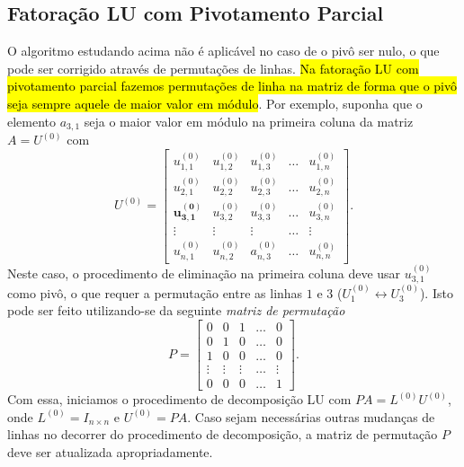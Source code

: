 \subsection{Fatoração LU com Pivotamento Parcial}

O algoritmo estudando acima não é aplicável no caso de o pivô ser nulo, o que pode ser corrigido através de permutações de linhas. \hl{Na fatoração LU com pivotamento parcial fazemos permutações de linha na matriz de forma que o pivô seja sempre aquele de maior valor em módulo}. Por exemplo, suponha que o elemento $a_{3,1}$ seja o maior valor em módulo na primeira coluna da matriz $A = U^{(0)}$ com
\begin{equation}
  U^{(0)} = \begin{bmatrix}
    u_{1,1}^{(0)} & u_{1,2}^{(0)} & u_{1,3}^{(0)} & \ldots & u_{1,n}^{(0)} \\
    u_{2,1}^{(0)} & u_{2,2}^{(0)} & u_{2,3}^{(0)} & \ldots & u_{2,n}^{(0)} \\
    \pmb{u_{3,1}^{(0)}} & u_{3,2}^{(0)} & u_{3,3}^{(0)} & \ldots & u_{3,n}^{(0)} \\
    \vdots & \vdots & \vdots & \ldots & \vdots \\
    u_{n,1}^{(0)} & u_{n,2}^{(0)} & a_{n,3}^{(0)} & \ldots & u_{n,n}^{(0)}
  \end{bmatrix}.
\end{equation}
Neste caso, o procedimento de eliminação na primeira coluna deve usar $u_{3,1}^{(0)}$ como pivô, o que requer a permutação entre as linhas $1$ e $3$ ($U_1^{(0)} \leftrightarrow U_3^{(0)}$). Isto pode ser feito utilizando-se da seguinte \emph{matriz de permutação}
\begin{equation}
  P =
  \begin{bmatrix}
    0 & 0 & 1 & \ldots & 0\\
    0 & 1 & 0 & \ldots & 0\\
    1 & 0 & 0 & \ldots & 0\\
    \vdots & \vdots & \vdots & \ldots & \vdots\\
    0 & 0 & 0 & \ldots & 1
  \end{bmatrix}.
\end{equation}
Com essa, iniciamos o procedimento de decomposição LU com $PA = L^{(0)}U^{(0)}$, onde $L^{(0)} = I_{n\times n}$ e $U^{(0)} = PA$. Caso sejam necessárias outras mudanças de linhas no decorrer do procedimento de decomposição, a matriz de permutação $P$ deve ser atualizada apropriadamente.

